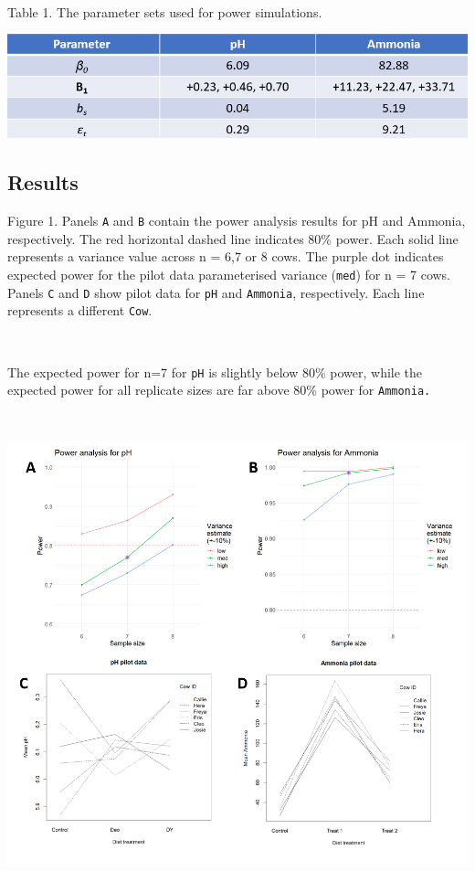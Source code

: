 \documentclass[
]{article}
\begin{document}
~

Table 1. The parameter sets used for power simulations.

\includegraphics{figs/parameters.png}

\newpage

\hypertarget{results}{%
\subsection{Results}\label{results}}

Figure 1. Panels \texttt{A} and \texttt{B} contain the power analysis
results for pH and Ammonia, respectively. The red horizontal dashed line
indicates 80\% power. Each solid line represents a variance value across
n = 6,7 or 8 cows. The purple dot indicates expected power for the pilot
data parameterised variance (\texttt{med}) for n = 7 cows. Panels
\texttt{C} and \texttt{D} show pilot data for \texttt{pH} and
\texttt{Ammonia}, respectively. Each line represents a different
\texttt{Cow}.

~

The expected power for n=7 for \texttt{pH} is slightly below 80\% power,
while the expected power for all replicate sizes are far above 80\%
power for \texttt{Ammonia.}

~

\includegraphics{figs/Fig1.png}
\end{document}
